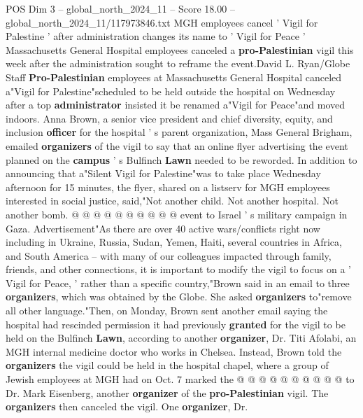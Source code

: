 \begin{textsample}{POS Dim 3 – global\_north\_2024\_11 – Score 18.00 – global\_north\_2024\_11/117973846.txt}  \label{ex:f3_pos_178}
MGH employees cancel ' Vigil for Palestine ' after administration changes its name to ' Vigil for Peace ' Massachusetts General Hospital employees canceled a \textbf{pro-Palestinian} vigil this week after the administration sought to reframe the event.David L.
Ryan/Globe Staff \textbf{Pro-Palestinian} employees at Massachusetts General Hospital canceled a"Vigil for Palestine"scheduled to be held outside the hospital on Wednesday after a top \textbf{administrator} insisted it be renamed a"Vigil for Peace"and moved indoors.
Anna Brown, a senior vice president and chief diversity, equity, and inclusion \textbf{officer} for the hospital ' s parent organization, Mass General Brigham, emailed \textbf{organizers} of the vigil to say that an online flyer advertising the event planned on the \textbf{campus} ' s Bulfinch \textbf{Lawn} needed to be reworded.
In addition to announcing that a"Silent Vigil for Palestine"was to take place Wednesday afternoon for 15 minutes, the flyer, shared on a listserv for MGH employees interested in social justice, said,"Not another child.
Not another hospital.
Not another bomb. @ @ @ @ @ @ @ @ @ @ event to Israel ' s military campaign in Gaza.
Advertisement"As there are over 40 active wars/conflicts right now including in Ukraine, Russia, Sudan, Yemen, Haiti, several countries in Africa, and South America -- with many of our colleagues impacted through family, friends, and other connections, it is important to modify the vigil to focus on a ' Vigil for Peace, ' rather than a specific country,"Brown said in an email to three \textbf{organizers}, which was obtained by the Globe.
She asked \textbf{organizers} to"remove all other language."Then, on Monday, Brown sent another email saying the hospital had rescinded permission it had previously \textbf{granted} for the vigil to be held on the Bulfinch \textbf{Lawn}, according to another \textbf{organizer}, Dr.
Titi Afolabi, an MGH internal medicine doctor who works in Chelsea.
Instead, Brown told the \textbf{organizers} the vigil could be held in the hospital chapel, where a group of Jewish employees at MGH had on Oct. 7 marked the @ @ @ @ @ @ @ @ @ @ to Dr.
Mark Eisenberg, another \textbf{organizer} of the \textbf{pro-Palestinian} vigil.
The \textbf{organizers} then canceled the vigil.
One \textbf{organizer}, Dr.

\end{textsample}
